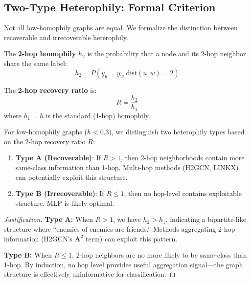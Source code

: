 \subsection{Two-Type Heterophily: Formal Criterion}

Not all low-homophily graphs are equal. We formalize the distinction between recoverable and irrecoverable heterophily.

\begin{definition}
\label{def:2hop}
The \textbf{2-hop homophily} $h_2$ is the probability that a node and its 2-hop neighbor share the same label:
\begin{equation}
    h_2 = P(y_u = y_w | \text{dist}(u, w) = 2)
\end{equation}
\end{definition}

\begin{definition}
\label{def:recovery_ratio}
The \textbf{2-hop recovery ratio} is:
\begin{equation}
    R = \frac{h_2}{h_1}
\end{equation}
where $h_1 = h$ is the standard (1-hop) homophily.
\end{definition}

\begin{proposition}
\label{prop:two_type}
For low-homophily graphs ($h < 0.3$), we distinguish two heterophily types based on the 2-hop recovery ratio $R$:
\begin{enumerate}
    \item \textbf{Type A (Recoverable)}: If $R > 1$, then 2-hop neighborhoods contain more same-class information than 1-hop. Multi-hop methods (H2GCN, LINKX) can potentially exploit this structure.

    \item \textbf{Type B (Irrecoverable)}: If $R \leq 1$, then no hop-level contains exploitable structure. MLP is likely optimal.
\end{enumerate}
\end{proposition}

\begin{proof}[Justification]
\textbf{Type A:} When $R > 1$, we have $h_2 > h_1$, indicating a bipartite-like structure where ``enemies of enemies are friends.'' Methods aggregating 2-hop information (H2GCN's $\mathbf{A}^2$ term) can exploit this pattern.

\textbf{Type B:} When $R \leq 1$, 2-hop neighbors are no more likely to be same-class than 1-hop. By induction, no hop level provides useful aggregation signal---the graph structure is effectively uninformative for classification.
\end{proof}

